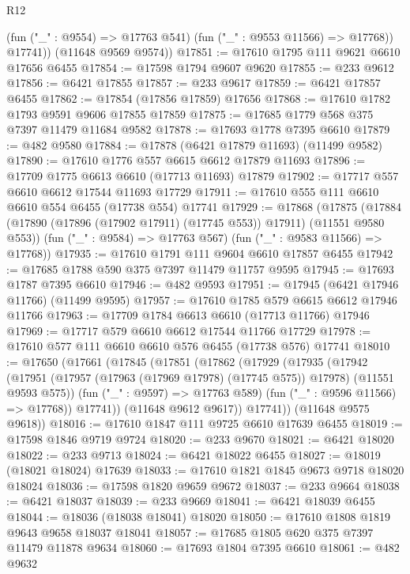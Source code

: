 \begin{lexlean}{R12}
\begin{coremodule}
            (fun ("_" : @9554) => @17763 @541)
            (fun ("_" : @9553 @11566) => @17768))
          @17741))
      (@11648 @9569 @9574))
@17851 := @17610 @1795 @111 @9621 @6610 @17656 @6455
@17854 := @17598 @1794 @9607 @9620
@17855 := @233 @9612
@17856 := @6421 @17855
@17857 := @233 @9617
@17859 := @6421 @17857 @6455
@17862 := @17854 (@17856 @17859) @17656
@17868 := @17610 @1782 @1793 @9591 @9606 @17855 @17859
@17875 := @17685 @1779 @568 @375 @7397 @11479 @11684 @9582
@17878 := @17693 @1778 @7395 @6610
@17879 := @482 @9580
@17884 := @17878 (@6421 @17879 @11693) (@11499 @9582)
@17890 := @17610 @1776 @557 @6615 @6612 @17879 @11693
@17896 := @17709 @1775 @6613 @6610 (@17713 @11693) @17879
@17902 := @17717 @557 @6610 @6612 @17544 @11693 @17729
@17911 := @17610 @555 @111 @6610 @6610 @554 @6455 (@17738 @554) @17741
@17929 := @17868
    (@17875
      (@17884 (@17890 (@17896 (@17902 @17911) (@17745 @553)) @17911) (@11551 @9580 @553))
      (fun ("_" : @9584) => @17763 @567)
      (fun ("_" : @9583 @11566) => @17768))
@17935 := @17610 @1791 @111 @9604 @6610 @17857 @6455
@17942 := @17685 @1788 @590 @375 @7397 @11479 @11757 @9595
@17945 := @17693 @1787 @7395 @6610
@17946 := @482 @9593
@17951 := @17945 (@6421 @17946 @11766) (@11499 @9595)
@17957 := @17610 @1785 @579 @6615 @6612 @17946 @11766
@17963 := @17709 @1784 @6613 @6610 (@17713 @11766) @17946
@17969 := @17717 @579 @6610 @6612 @17544 @11766 @17729
@17978 := @17610 @577 @111 @6610 @6610 @576 @6455 (@17738 @576) @17741
@18010 := @17650
    (@17661
      (@17845
        (@17851
          (@17862
            (@17929
              (@17935
                (@17942
                  (@17951
                    (@17957 (@17963 (@17969 @17978) (@17745 @575)) @17978)
                    (@11551 @9593 @575))
                  (fun ("_" : @9597) => @17763 @589)
                  (fun ("_" : @9596 @11566) => @17768))
                @17741))
            (@11648 @9612 @9617))
          @17741))
      (@11648 @9575 @9618))
@18016 := @17610 @1847 @111 @9725 @6610 @17639 @6455
@18019 := @17598 @1846 @9719 @9724
@18020 := @233 @9670
@18021 := @6421 @18020
@18022 := @233 @9713
@18024 := @6421 @18022 @6455
@18027 := @18019 (@18021 @18024) @17639
@18033 := @17610 @1821 @1845 @9673 @9718 @18020 @18024
@18036 := @17598 @1820 @9659 @9672
@18037 := @233 @9664
@18038 := @6421 @18037
@18039 := @233 @9669
@18041 := @6421 @18039 @6455
@18044 := @18036 (@18038 @18041) @18020
@18050 := @17610 @1808 @1819 @9643 @9658 @18037 @18041
@18057 := @17685 @1805 @620 @375 @7397 @11479 @11878 @9634
@18060 := @17693 @1804 @7395 @6610
@18061 := @482 @9632

\end{coremodule}
\end{lexlean}
